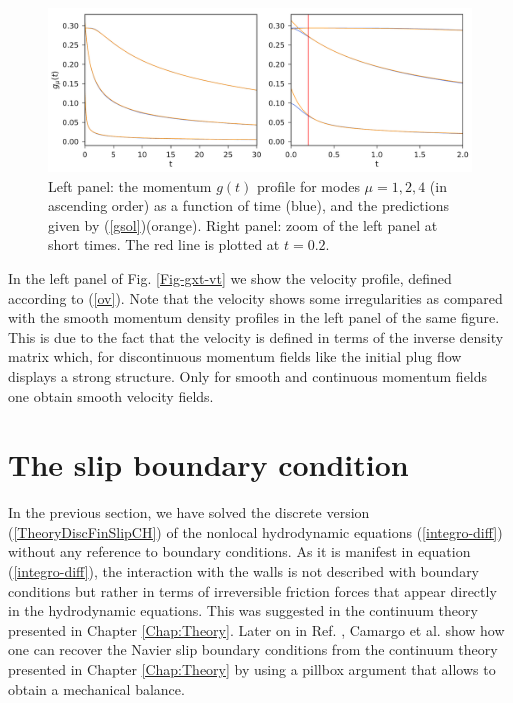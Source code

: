 \documentclass[b5paper,openright,10pt]{book}
\begin{document}
\begin{figure}[!h]
    \centering
\includegraphics[scale=0.41]{gxtPredictions-17nodes-WALLS}
\caption[The momentum profile as a function of time for a confined fluid - Thick bins]{Left  panel: the  momentum $g(t)$  profile for modes $\mu=1,2,4$ (in ascending order) as a function of time (blue), and the predictions given by (\ref{gsol})(orange). Right panel: zoom of the left panel at short times. The red line is plotted at $t=0.2$.}
\label{Fig-gxtPredictions}
\end{figure}

In  the left panel of Fig.   \ref{Fig-gxt-vt}  we  show  the  velocity  profile,  defined
according  to   (\ref{ov}).   Note   that  the  velocity   shows  some
irregularities as  compared with the smooth  momentum density profiles
in the left panel of the same figure.  This is due to the fact  that the velocity
is  defined  in  terms  of  the  inverse  density  matrix  which,  for
discontinuous momentum fields like the  initial plug flow  displays a
strong structure. Only for smooth and continuous momentum fields one obtain
smooth velocity fields.


\section{The slip boundary condition}
\label{Sec:BC}
In  the  previous  section,  we   have  solved  the  discrete  version
(\ref{TheoryDiscFinSlipCH})   of   the  nonlocal   hydrodynamic   equations
(\ref{integro-diff}) without any reference to boundary conditions.  As
it is manifest in equation   (\ref{integro-diff}), the interaction with the
walls is not described with boundary conditions but rather in terms of
irreversible friction forces that  appear directly in the hydrodynamic
equations.  This  was suggested in  the continuum theory  presented in
Chapter \ref{Chap:Theory}. Later  on in Ref. \cite{CamargoBC2018}, Camargo et al. show how
one can recover the Navier slip boundary conditions from the continuum
theory presented in Chapter \ref{Chap:Theory}  by using  a pillbox  argument that
allows to obtain a mechanical balance.
\end{document}
